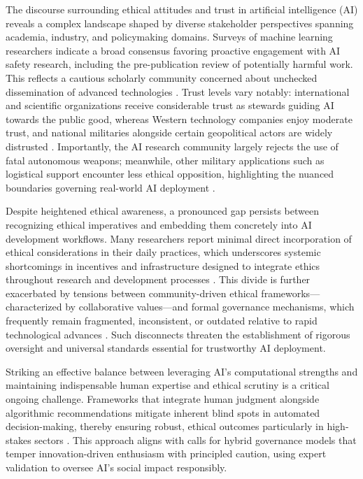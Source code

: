 \documentclass[sigconf]{acmart}
\begin{document}
The discourse surrounding ethical attitudes and trust in artificial intelligence (AI) reveals a complex landscape shaped by diverse stakeholder perspectives spanning academia, industry, and policymaking domains. Surveys of machine learning researchers indicate a broad consensus favoring proactive engagement with AI safety research, including the pre-publication review of potentially harmful work. This reflects a cautious scholarly community concerned about unchecked dissemination of advanced technologies \cite{ref9}. Trust levels vary notably: international and scientific organizations receive considerable trust as stewards guiding AI towards the public good, whereas Western technology companies enjoy moderate trust, and national militaries alongside certain geopolitical actors are widely distrusted \cite{ref9,ref25}. Importantly, the AI research community largely rejects the use of fatal autonomous weapons; meanwhile, other military applications such as logistical support encounter less ethical opposition, highlighting the nuanced boundaries governing real-world AI deployment \cite{ref9,ref25}.

Despite heightened ethical awareness, a pronounced gap persists between recognizing ethical imperatives and embedding them concretely into AI development workflows. Many researchers report minimal direct incorporation of ethical considerations in their daily practices, which underscores systemic shortcomings in incentives and infrastructure designed to integrate ethics throughout research and development processes \cite{ref9,ref25}. This divide is further exacerbated by tensions between community-driven ethical frameworks—characterized by collaborative values—and formal governance mechanisms, which frequently remain fragmented, inconsistent, or outdated relative to rapid technological advances \cite{ref25,ref36}. Such disconnects threaten the establishment of rigorous oversight and universal standards essential for trustworthy AI deployment.

Striking an effective balance between leveraging AI’s computational strengths and maintaining indispensable human expertise and ethical scrutiny is a critical ongoing challenge. Frameworks that integrate human judgment alongside algorithmic recommendations mitigate inherent blind spots in automated decision-making, thereby ensuring robust, ethical outcomes particularly in high-stakes sectors \cite{ref2}. This approach aligns with calls for hybrid governance models that temper innovation-driven enthusiasm with principled caution, using expert validation to oversee AI’s social impact responsibly.
\end{document}
